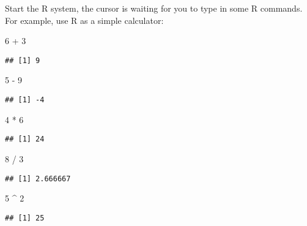 \documentclass[]{book}
\newenvironment{Shaded}{\begin{snugshade}}{\end{snugshade}}
\newcommand{\DecValTok}[1]{\textcolor[rgb]{0.00,0.00,0.81}{{#1}}}
\newcommand{\StringTok}[1]{\textcolor[rgb]{0.31,0.60,0.02}{{#1}}}
\newcommand{\NormalTok}[1]{{#1}}
\begin{document}
Start the R system, the cursor is waiting for you to type in some R
commands. For example, use R as a simple calculator:

\begin{Shaded}
\begin{Highlighting}[]
\DecValTok{6} \NormalTok{+}\StringTok{ }\DecValTok{3}
\end{Highlighting}
\end{Shaded}

\begin{verbatim}
## [1] 9
\end{verbatim}

\begin{Shaded}
\begin{Highlighting}[]
\DecValTok{5} \NormalTok{-}\StringTok{ }\DecValTok{9}
\end{Highlighting}
\end{Shaded}

\begin{verbatim}
## [1] -4
\end{verbatim}

\begin{Shaded}
\begin{Highlighting}[]
\DecValTok{4} \NormalTok{*}\StringTok{ }\DecValTok{6}
\end{Highlighting}
\end{Shaded}

\begin{verbatim}
## [1] 24
\end{verbatim}

\begin{Shaded}
\begin{Highlighting}[]
\DecValTok{8} \NormalTok{/}\StringTok{ }\DecValTok{3}
\end{Highlighting}
\end{Shaded}

\begin{verbatim}
## [1] 2.666667
\end{verbatim}

\begin{Shaded}
\begin{Highlighting}[]
\DecValTok{5} \NormalTok{^}\StringTok{ }\DecValTok{2}
\end{Highlighting}
\end{Shaded}

\begin{verbatim}
## [1] 25
\end{verbatim}
\end{document}
